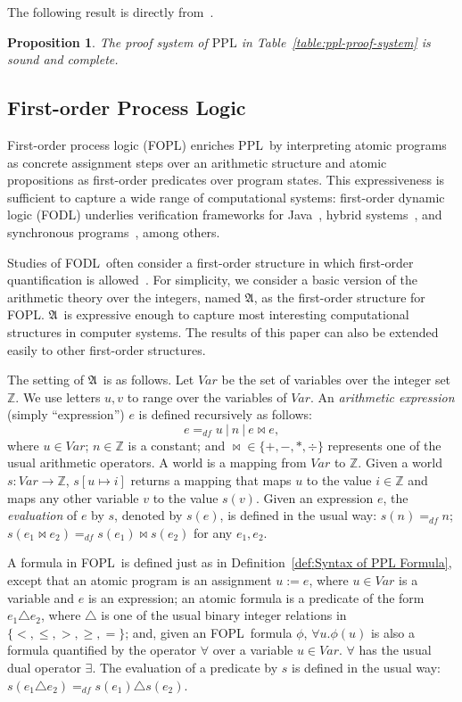 \documentclass[manuscript,screen]{acmart}
\newtheorem{prop}{Proposition}[section]
\newcommand{\mbb}[1]{\mathbb{#1}}
\newcommand{\mfr}[1]{\mathfrak{#1}}
\newcommand{\dddef}[0]{=_{df}}
\newcommand{\Var}[0]{\mathit{Var}}
\newcommand{\Arith}[0]{\mbox{$\mfr{A}$}}
\newcommand{\PPL}[0]{\mbox{PPL}}
\newcommand{\FOPL}[0]{\mbox{FOPL}}
\newcommand{\FODL}[0]{\mbox{FODL}}
\begin{document}
The following result is directly from~\cite{Harel82}. 


\begin{prop}
The proof system of $\PPL$ in Table~\ref{table:ppl-proof-system} is sound and complete. 
\end{prop}



\subsection{First-order Process Logic}
\label{section:First-order Process Logic}

First-order process logic (\FOPL) enriches \PPL\ by interpreting atomic programs as concrete assignment steps over an arithmetic structure and atomic propositions as first-order predicates over program states. 
This expressiveness is sufficient to capture a wide range of computational systems: first-order dynamic logic (\FODL) underlies verification frameworks for Java~\cite{Beckert2016}, hybrid systems~\cite{Platzer18}, and synchronous programs~\cite{Zhang21,Zhang22}, among others. 

Studies of \FODL\ often consider a first-order structure in which first-order quantification is allowed~\cite{Harel00}. 
For simplicity, we consider a basic version of the arithmetic theory over the integers, named \Arith, as the first-order structure for \FOPL. 
\Arith\ is expressive enough to capture most interesting computational structures in computer systems. 
The results of this paper can also be extended easily to other first-order structures. 


The setting of \Arith\ is as follows. Let $\Var$ be the set of variables over the integer set $\mbb{Z}$. 
We use letters $u,v$ to range over the variables of $\Var$. 
An \emph{arithmetic expression} (simply ``expression'') $e$ is defined recursively as follows:
$$
e \dddef u\ |\ n\ |\ e \bowtie e,
$$
where $u\in\Var$; $n\in \mbb{Z}$ is a constant; and $\bowtie\in \{+,-,*,\div\}$ represents one of the usual arithmetic operators. 
A world is a mapping from $\Var$ to $\mbb{Z}$.
Given a world $s : \Var\to \mbb{Z}$,  
$s[u\mapsto i]$ returns a mapping that maps $u$ to the value $i\in \mbb{Z}$ and maps any other variable $v$ to the value $s(v)$. 
Given an expression $e$, the \emph{evaluation} of $e$ by $s$, denoted by $s(e)$, is defined in the usual way: $s(n) \dddef n$; $s(e_1\bowtie e_2)\dddef s(e_1)\bowtie s(e_2)$ for any $e_1, e_2$.  

A formula in \FOPL\ is defined just as in Definition~\ref{def:Syntax of PPL Formula}, except that an atomic program is an assignment $u := e$, where $u\in \Var$ is a variable and $e$ is an expression; an atomic formula is a predicate of the form $e_1 \triangle e_2$, where $\triangle$ is one of the usual binary integer relations in $\{<, \le, >, \ge, =\}$; and, given an \FOPL\ formula $\phi$, $\forall u.\phi(u)$ is also a formula quantified by the operator $\forall$ over a variable $u\in \Var$. 
$\forall$ has the usual dual operator $\exists$. 
The evaluation of a predicate by $s$ is defined in the usual way: $s(e_1\triangle e_2)\dddef s(e_1)\triangle s(e_2)$.
\end{document}

